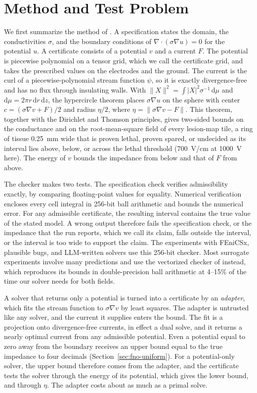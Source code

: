 \documentclass[11pt]{article}
\begin{document}
\section{Method and Test Problem}\label{sec:recap}

We first summarize the method of \cite{dovelos2026}. A specification states the domain, the
conductivities $\sigma$, and the boundary conditions of
$\nabla\cdot(\sigma\nabla u)=0$ for the potential $u$. A certificate consists of a
potential $v$ and a current $F$. The potential is piecewise polynomial on a tensor
grid, which we call the certificate grid, and takes the prescribed values on the electrodes and the ground. The current
is the curl of a piecewise-polynomial stream function $\psi$, so it is exactly
divergence-free and has no flux through insulating walls. With
$\lVert X\rVert^2=\int|X|^2\sigma^{-1}\,\mathrm{d}\mu$ and $\mathrm{d}\mu=2\pi r\,\mathrm{d}r\,\mathrm{d}z$, the hypercircle theorem
places $\sigma\nabla u$ on the sphere with center $c=(\sigma\nabla v+F)/2$ and
radius $\eta/2$, where $\eta=\lVert\sigma\nabla v-F\rVert$. This theorem, together
with the Dirichlet and Thomson principles, gives two-sided bounds on the conductance
and on the root-mean-square field of every lesion-map tile, a ring of tissue
\SI{0.25}{mm} wide that is proven lethal, proven spared, or undecided as its interval
lies above, below, or across the lethal threshold (\SI{700}{V/cm} at \SI{1000}{V}
here). The energy of $v$ bounds
the impedance from below and that of $F$ from above.

The checker makes two tests. The specification check verifies admissibility
exactly, by comparing floating-point values for equality. Numerical verification
encloses every cell integral in 256-bit ball arithmetic and bounds the numerical
error. For any admissible certificate, the resulting interval contains the true
value of the stated model. A wrong output therefore fails the specification check,
or the impedance that the run reports, which we call its claim, falls outside the
interval, or
the interval is too wide to support the claim. The experiments with FEniCSx,
plausible bugs, and LLM-written solvers use this 256-bit checker. Most surrogate
experiments involve many predictions and use the vectorized checker of
\cite{dovelos2026} instead, which reproduces its bounds in double-precision ball
arithmetic at 4--15\% of the time our solver needs for both fields.

A solver that returns only a potential is turned into a certificate by an
\emph{adapter}, which fits the stream function to $\sigma\nabla v$ by least squares.
The adapter is untrusted like any solver, and the current it supplies enters the bound. The fit
is a projection onto divergence-free currents, in effect a dual solve, and it returns
a nearly optimal current from any admissible potential. Even
a potential equal to zero away from the boundary receives an upper bound equal to the
true impedance to four decimals (Section~\ref{sec:fno-uniform}). For a
potential-only solver, the upper bound therefore comes from the adapter, and the
certificate tests the solver through the energy of its potential, which gives the
lower bound, and through $\eta$. The adapter costs about as much as a primal solve.
\end{document}
